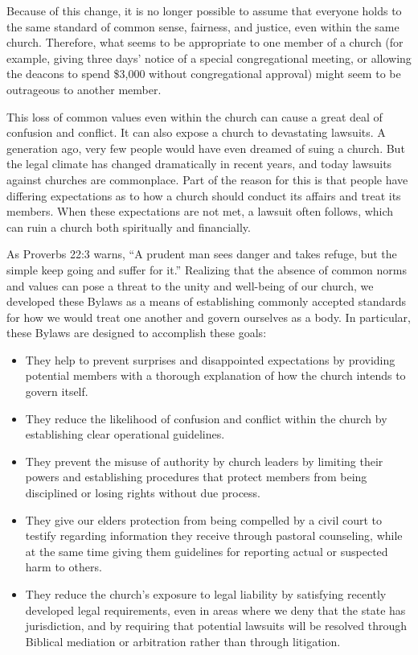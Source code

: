 \documentclass[
]{book}
\begin{document}
Because of this change, it is no longer possible to assume that everyone holds to the same standard of common sense, fairness, and justice, even within the same church. Therefore, what seems to be appropriate to one member of a church (for example, giving three days' notice of a special congregational meeting, or allowing the deacons to spend \$3,000 without congregational approval) might seem to be outrageous to another member.

This loss of common values even within the church can cause a great deal of confusion and conflict. It can also expose a church to devastating lawsuits. A generation ago, very few people would have even dreamed of suing a church. But the legal climate has changed dramatically in recent years, and today lawsuits against churches are commonplace. Part of the reason for this is that people have differing expectations as to how a church should conduct its affairs and treat its members. When these expectations are not met, a lawsuit often follows, which can ruin a church both spiritually and financially.

As Proverbs 22:3 warns, ``A prudent man sees danger and takes refuge, but the simple keep going and suffer for it.'' Realizing that the absence of common norms and values can pose a threat to the unity and well-being of our church, we developed these Bylaws as a means of establishing commonly accepted standards for how we would treat one another and govern ourselves as a body. In particular, these Bylaws are designed to accomplish these goals:

\begin{itemize}
\item
  They help to prevent surprises and disappointed expectations by providing potential members with a thorough explanation of how the church intends to govern itself.
\item
  They reduce the likelihood of confusion and conflict within the church by establishing clear operational guidelines.
\item
  They prevent the misuse of authority by church leaders by limiting their powers and establishing procedures that protect members from being disciplined or losing rights without due process.
\item
  They give our elders protection from being compelled by a civil court to testify regarding information they receive through pastoral counseling, while at the same time giving them guidelines for reporting actual or suspected harm to others.
\item
  They reduce the church's exposure to legal liability by satisfying recently developed legal require­ments, even in areas where we deny that the state has jurisdiction, and by requiring that potential lawsuits will be resolved through Biblical mediation or arbitration rather than through litigation.
\end{itemize}
\end{document}
